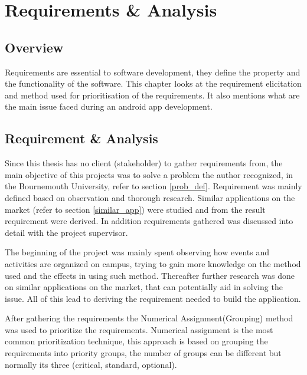 \chapter{Requirements \& Analysis}
\label{req_analysis}
\section{Overview}
Requirements are essential to software development, they define the property and the functionality of the software. This chapter looks at the requirement elicitation and method used for prioritisation of the requirements. It also mentions what are the main issue faced during an android app development.

\section{Requirement \& Analysis}
Since this thesis has no client (stakeholder) to gather requirements from, the main objective of this projects was to solve a problem the author recognized, in the Bournemouth University, refer  to section \ref{prob_def}. Requirement was mainly defined based on observation and thorough research. Similar applications on the market (refer to section \ref{similar_app}) were studied and from the result requirement were derived. In addition requirements gathered was discussed into detail with the project supervisor.

The beginning of the project was mainly spent observing how events and activities are organized on campus, trying to gain more knowledge on the method used and the effects in using such method. Thereafter further research was done on similar applications on the market, that can potentially aid in solving the issue. All of this lead to deriving the requirement needed to build the application.

After gathering the requirements the Numerical Assignment(Grouping) method was used to prioritize the requirements.
Numerical assignment is the most common  prioritization technique, this approach is based on  grouping the requirements into priority groups, the number of groups can be different but normally its three (critical, standard, optional).


